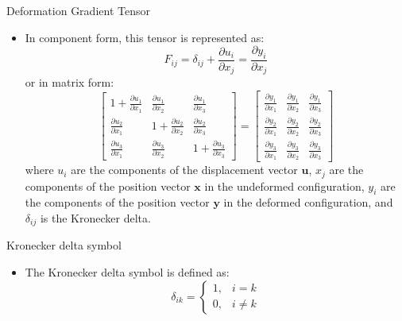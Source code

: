 \documentclass[aspectratio=169,11pt]{beamer}
\begin{document}
\begin{frame}{Deformation Gradient Tensor}
\begin{itemize}
        \item In component form, this tensor is represented as:
            \[
            F_{ij} = \delta_{ij} + \frac{\partial u_i}{\partial x_j} = \frac{\partial y_i}{\partial x_j}
            \]
            or in matrix form:
            \[
            \begin{bmatrix}
                1 + \frac{\partial u_1}{\partial x_1} & \frac{\partial u_1}{\partial x_2} & \frac{\partial u_1}{\partial x_3} \\
                \frac{\partial u_2}{\partial x_1} & 1 + \frac{\partial u_2}{\partial x_2} & \frac{\partial u_2}{\partial x_3} \\
                \frac{\partial u_3}{\partial x_1} & \frac{\partial u_3}{\partial x_2} & 1 + \frac{\partial u_3}{\partial x_3}
            \end{bmatrix}
            =
            \begin{bmatrix}
                \frac{\partial y_1}{\partial x_1} & \frac{\partial y_1}{\partial x_2} & \frac{\partial y_1}{\partial x_3} \\
                \frac{\partial y_2}{\partial x_1} & \frac{\partial y_2}{\partial x_2} & \frac{\partial y_2}{\partial x_3} \\
                \frac{\partial y_3}{\partial x_1} & \frac{\partial y_3}{\partial x_2} & \frac{\partial y_3}{\partial x_3}
            \end{bmatrix}
            \]
            where \(u_i\) are the components of the displacement vector \(\mathbf{u}\), \(x_j\) are the components of the position vector \(\mathbf{x}\) in the undeformed configuration, \(y_i\) are the components of the position vector \(\mathbf{y}\) in the deformed configuration, and \(\delta_{ij}\) is the Kronecker delta.
    \end{itemize}
\end{frame}

\begin{frame}{Kronecker delta symbol}
    \begin{itemize}
        \item  The Kronecker delta symbol is defined as:
        $$
        \delta_{ik}=\begin{cases}
          1, & i=k \\
          0, & i \ne k
        \end{cases}
        $$
    \end{itemize}
\end{frame}
\end{document}
